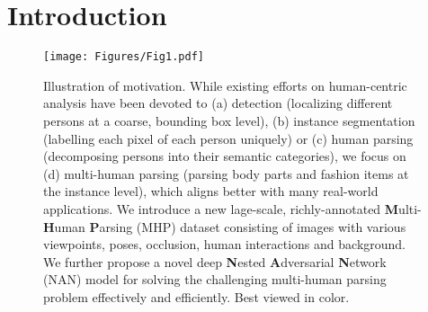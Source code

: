 \documentclass[10pt,twocolumn,letterpaper]{article}
\theoremstyle{definition}
\theoremstyle{remark}
\begin{document}
\section{Introduction}

\begin{figure}[t]
	\begin{center}
		\texttt{[image: Figures/Fig1.pdf]}
	\end{center}
	\vspace{-5mm}
	\small
	\caption{\small Illustration of motivation. While existing efforts on human-centric analysis have been devoted to (a) detection (localizing different persons at a coarse, bounding box level), (b) instance segmentation (labelling each pixel of each person uniquely) or (c) human parsing (decomposing persons into their semantic categories), we focus on (d) multi-human parsing (parsing body parts and fashion items at the instance level), which aligns better with many real-world applications. We introduce a new lage-scale, richly-annotated \textbf{M}ulti-\textbf{H}uman \textbf{P}arsing (MHP) dataset consisting of images with various viewpoints, poses, occlusion, human interactions and background. We further propose a novel deep \textbf{N}ested \textbf{A}dversarial \textbf{N}etwork (NAN) model for solving the challenging multi-human parsing problem effectively and efficiently. Best viewed in color.}
	\label{fig: Fig1}
	\vspace{-2mm}
\end{figure}
\end{document}

